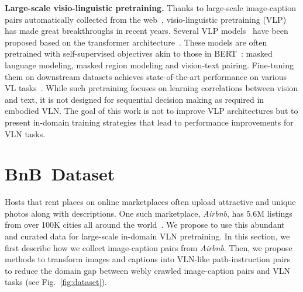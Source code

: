 \RequirePackage[dvipsnames,table]{xcolor} \documentclass[10pt,twocolumn,letterpaper]{article}
\newcommand{\p}[1]{\vspace{1mm}\noindent\textbf{#1}}
\newcommand{\airbnb}{BnB}
\begin{document}
\p{Large-scale visio-linguistic pretraining.}
Thanks to large-scale image-caption pairs automatically collected from the web~\cite{miech2019howto100m, ordonez2011sbu, radford2021learning, ConceptualCaptions}, visio-linguistic pretraining (VLP) has made great breakthroughs in recent years.
Several VLP models~\cite{chen2020uniter, li2020oscar, lu2019vilbert, tan2019lxmert} have been proposed based on the transformer architecture~\cite{vaswani2017attention}.
These models are often pretrained with self-supervised objectives akin to those in BERT~\cite{devlin2018bert}:
masked language modeling, masked region modeling and vision-text pairing.
Fine-tuning them on downstream datasets achieves state-of-the-art performance on various VL tasks~\cite{antol2015vqa, kazemzadeh2014referitgame, wang2016learning, vinyals2016show}.
While such pretraining focuses on learning correlations between vision and text, it is not designed for sequential decision making as required in embodied VLN.
The goal of this work is not to improve VLP architectures but to present in-domain training strategies that lead to performance improvements for VLN tasks.





































 \section{\airbnb~Dataset}
\label{sec:airbnb}

Hosts that rent places on online marketplaces often upload attractive and unique photos along with descriptions.
One such marketplace, \emph{Airbnb}, has 5.6M listings from over 100K cities all around the world~\cite{airbnb}.
We propose to use this abundant and curated data for large-scale in-domain VLN pretraining.
In this section, we first describe how we collect image-caption  pairs from \emph{Airbnb}.
Then, we propose methods to transform images and captions into VLN-like path-instruction pairs to reduce the domain gap between webly crawled image-caption pairs and VLN tasks (see Fig.~\ref{fig:dataset}).
\end{document}
